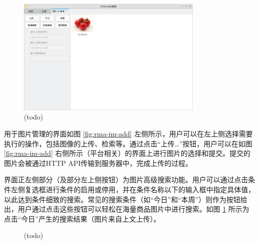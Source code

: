 \begin{figure}[htbp]
	\centering
	\includegraphics[width=0.8\textwidth]{./exp/rma-im-as.png}
	\caption{(todo)}
	\label{fig:rma-im-as}
\end{figure}

用于图片管理的界面如图 \ref{fig:rma-im-add} 左侧所示，用户可以在左上侧选择需要执行的操作，包括图像的上传、检索等。通过点击“上传\dots”按钮，用户可以在如图 \ref{fig:rma-im-add} 右侧所示（平台相关）的界面上进行图片的选择和提交。提交的图片会被通过HTTP API传输到服务器中，完成上传的过程。

界面正左侧部分（及部分左上侧按钮）为图片高级搜索功能。用户可以通过点击条件左侧复选框进行条件的启用或停用，并在条件名称以下的输入框中指定具体值，以此达到条件细致的搜索。常见的搜索条件（如“今日”和“本周”）则作为按钮给出，用户通过点击这些按钮可以轻松在海量商品图片中进行搜索。如图 \ref{fig:rma-im-as} 所示为点击“今日”产生的搜索结果（图片来自上文上传）。

\begin{figure}[htbp]
    \hfill
    \hfill
	\caption{(todo)}
	\label{fig:rma-prod-add}
\end{figure}

